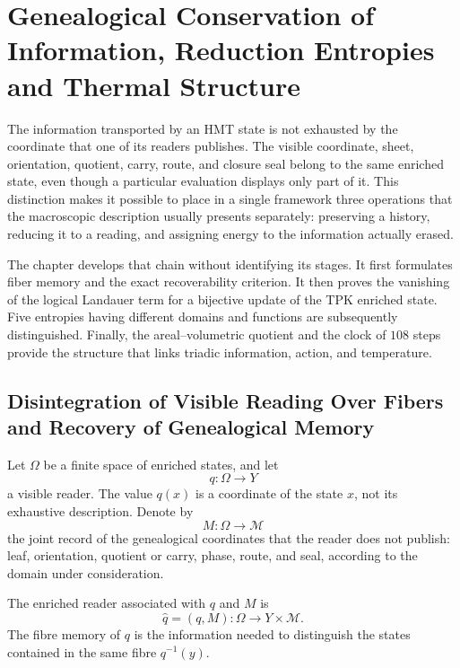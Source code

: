 \chapter{Genealogical Conservation of Information, Reduction Entropies and Thermal Structure}
\label{chap:informacion-entropia-landauer}

The information transported by an HMT state is not exhausted by the coordinate that
one of its readers publishes. The visible coordinate, sheet, orientation,
quotient, carry, route, and closure seal belong to the same
enriched state, even though a particular evaluation displays only part of
it. This distinction makes it possible to place in a single framework three operations that the
macroscopic description usually presents separately: preserving a history,
reducing it to a reading, and assigning energy to the information actually
erased.

The chapter develops that chain without identifying its stages. It first
formulates fiber memory and the exact recoverability criterion. It then
proves the vanishing of the logical Landauer term for a bijective update
of the TPK enriched state. Five entropies having different domains and
functions are subsequently distinguished. Finally, the areal--volumetric quotient
and the clock of \(108\) steps provide the structure that
links triadic information, action, and temperature.

\section{Disintegration of Visible Reading Over Fibers and Recovery of Genealogical Memory}

Let \(\Omega\) be a finite space of enriched states, and let
\[
 q:\Omega\longrightarrow Y
\]
a visible reader. The value \(q(x)\) is a coordinate of the state \(x\), not its
exhaustive description. Denote by
\[
 M:\Omega\longrightarrow\mathcal M
\]
the joint record of the genealogical coordinates that the reader does not publish:
leaf, orientation, quotient or carry, phase, route, and seal, according to the
domain under consideration.

\begin{definition}
The enriched reader associated with \(q\) and \(M\) is
\begin{equation}
 \widehat q=(q,M):\Omega\longrightarrow Y\times\mathcal M.
 \label{eq:lector-enriquecido-informacion}
\end{equation}
The fibre memory of \(q\) is the information needed to distinguish the
states contained in the same fibre \(q^{-1}(y)\).
\end{definition}

